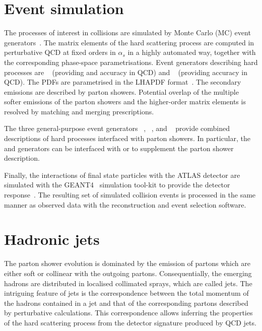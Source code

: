 \section{Event simulation}
\label{sec:pp:evgen}
The processes of interest in \HepProcess{\Pp\Pp} collisions are simulated by Monte Carlo (MC) event generators~\cite{Buckley2011,Sjostrand2016}.
The matrix elements of the hard scattering process are computed in perturbative QCD at fixed orders in \(\alpha_{s}\) in a highly automated way, together with the corresponding phase-space parametrisations. Event generators describing hard processes are \MGMCatNLO~\cite{Alwall:2014hca} (providing \LO and \NLO accuracy in QCD) and \POWHEG~\cite{Alioli:2010xd} (providing \NLO accuracy in QCD). The PDFs are parametrised in the LHAPDF format~\cite{Buckley2015}.
The secondary emissions are described by parton showers. Potential overlap of the multiple softer emissions of the parton showers and the higher-order matrix elements is resolved by matching and merging prescriptions.

The three general-purpose event generators \SHERPA~\cite{Gleisberg:2008ta}, \HERWIG~\cite{Bellm:2015jjp}, and \PYTHIA~\cite{Sjostrand:2014zea} provide combined descriptions of hard processes interfaced with parton showers. In particular, the \HERWIG and \PYTHIA generators can be interfaced with \MGMCatNLO or \POWHEG to supplement the parton shower description.

Finally, the interactions of final state particles with the ATLAS detector are simulated with the GEANT4~\cite{Agostinelli:2002hh} simulation tool-kit to provide the detector response~\cite{SOFT-2010-01}. The resulting set of simulated collision events is processed in the same manner as observed data with the reconstruction and event selection software.


\section{Hadronic jets}
\label{sec:pp:jets}
The parton shower evolution is dominated by the emission of partons which are either soft or collinear with the outgoing partons. Consequentially, the emerging hadrons are distributed in localised collimated sprays, which are called jets. The intriguing feature of jets is the correspondence between the total momentum of the hadrons contained in a jet and that of the corresponding partons described by perturbative calculations. This correspondence allows inferring the properties of the hard scattering process from the detector signature produced by QCD jets.


